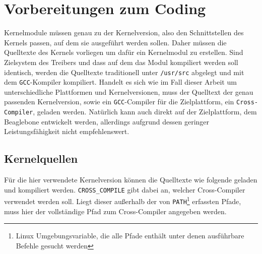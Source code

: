 \section{Vorbereitungen zum Coding} %
Kernelmodule müssen genau zu der Kernelversion, also den Schnittstellen des Kernels passen, auf dem sie ausgeführt werden sollen. Daher müssen die Quelltexte des Kernels vorliegen um dafür ein Kernelmodul zu erstellen. Sind Zielsystem des Treibers und dass auf dem das Modul kompiliert werden soll identisch, werden die Quelltexte traditionell unter \texttt{/usr/src} abgelegt und mit dem \texttt{GCC}-Kompiler kompiliert.
Handelt es sich wie im Fall dieser Arbeit um unterschiedliche Plattformen und Kernelversionen, muss der Quelltext der genau passenden Kernelversion, sowie ein \texttt{GCC}-Compiler für die Zielplattform, ein \texttt{Cross-Compiler}, geladen werden. Natürlich kann auch direkt auf der Zielplattform, dem Beaglebone entwickelt werden, allerdings aufgrund dessen geringer Leistungsfähigkeit nicht empfehlenswert.

\subsection{Kernelquellen}
Für die hier verwendete Kernelversion können die Quelltexte wie folgende geladen und kompiliert werden. \texttt{CROSS\_COMPILE} gibt dabei an, welcher Cross-Compiler verwendet werden soll. Liegt dieser außerhalb der von \texttt{PATH}\footnote{Linux Umgebungsvariable, die alle Pfade enthält unter denen ausführbare Befehle gesucht werden} erfassten Pfade, muss hier der vollständige Pfad zum Cross-Compiler angegeben werden.


